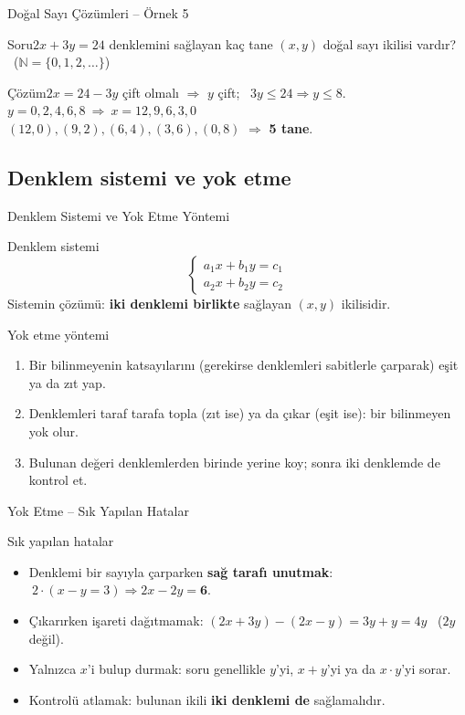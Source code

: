 \documentclass[aspectratio=169,11pt,handout]{beamer}
\newcommand{\soru}[3]{%
\begin{frame}{#1}
  \begin{block}{Soru}\large #2\end{block}
  \pause
  \begin{exampleblock}{Çözüm}\large #3\end{exampleblock}
\end{frame}}
\begin{document}
\soru{Doğal Sayı Çözümleri -- Örnek 5}
{\(2x+3y=24\) denklemini sağlayan kaç tane \((x,y)\) doğal sayı ikilisi vardır? \ (\(\mathbb{N}=\{0,1,2,\dots\}\))}
{\(2x=24-3y\) çift olmalı \(\Rightarrow\) \(y\) çift; \ \(3y\le 24\Rightarrow y\le 8\).\\[3pt]
\(y=0,2,4,6,8\ \Rightarrow\ x=12,9,6,3,0\)\\[3pt]
\((12,0),(9,2),(6,4),(3,6),(0,8)\) \(\Rightarrow\) \textbf{5 tane}.}

\subsection{Denklem sistemi ve yok etme}
\begin{frame}{Denklem Sistemi ve Yok Etme Yöntemi}
\begin{block}{Denklem sistemi}
\[\begin{cases}a_1x+b_1y=c_1\\ a_2x+b_2y=c_2\end{cases}\]
Sistemin çözümü: \textbf{iki denklemi birlikte} sağlayan \((x,y)\) ikilisidir.
\end{block}
\begin{block}{Yok etme yöntemi}
\begin{enumerate}
\item Bir bilinmeyenin katsayılarını (gerekirse denklemleri sabitlerle çarparak) eşit ya da zıt yap.
\item Denklemleri taraf tarafa topla (zıt ise) ya da çıkar (eşit ise): bir bilinmeyen yok olur.
\item Bulunan değeri denklemlerden birinde yerine koy; sonra iki denklemde de kontrol et.
\end{enumerate}
\end{block}
\end{frame}

\begin{frame}{Yok Etme -- Sık Yapılan Hatalar}
\begin{alertblock}{Sık yapılan hatalar}
\begin{itemize}
\item Denklemi bir sayıyla çarparken \textbf{sağ tarafı unutmak}: \(\ 2\cdot(x-y=3)\Rightarrow 2x-2y=\mathbf{6}\).
\item Çıkarırken işareti dağıtmamak: \((2x+3y)-(2x-y)=3y+y=4y\) \ (\(2y\) değil).
\item Yalnızca \(x\)'i bulup durmak: soru genellikle \(y\)'yi, \(x+y\)'yi ya da \(x\cdot y\)'yi sorar.
\item Kontrolü atlamak: bulunan ikili \textbf{iki denklemi de} sağlamalıdır.
\end{itemize}
\end{alertblock}
\end{frame}
\end{document}
